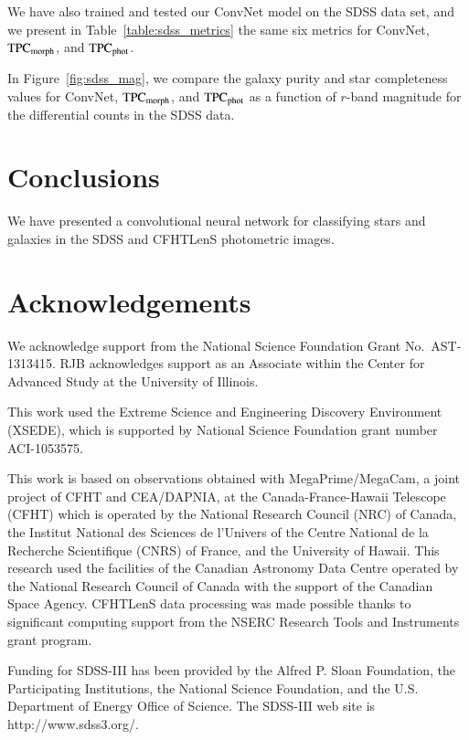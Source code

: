 \documentclass[fleqn,usenatbib]{mnras}
\begin{document}
We have also trained and tested our ConvNet model on the SDSS data set, and
we present in Table~\ref{table:sdss_metrics} the same six metrics for ConvNet,
${\mathrm{TPC}}_{{\mathrm{morph}}}$, and ${\mathrm{TPC}}_{{\mathrm{phot}}}$.

In Figure~\ref{fig:sdss_mag}, we compare the galaxy purity
and star completeness values for ConvNet, ${\mathrm{TPC}}_{{\mathrm{morph}}}$, and
${\mathrm{TPC}}_{{\mathrm{phot}}}$ as a
function of $r$-band magnitude for the differential counts in the SDSS data.



\section{Conclusions}
  \label{sec:conclusions}

We have presented a convolutional neural network for classifying stars and
galaxies in the SDSS and CFHTLenS photometric images.



\section*{Acknowledgements}

We acknowledge support from the 
National Science Foundation Grant No.\ AST-1313415.
RJB acknowledges support as an Associate
within the Center for Advanced Study at the University of Illinois.


This work used the Extreme Science and Engineering Discovery Environment
(XSEDE), which is supported by National Science Foundation grant number
ACI-1053575.

This work is based on observations obtained with MegaPrime/MegaCam, a
joint project of CFHT and CEA/DAPNIA, at the Canada-France-Hawaii
Telescope (CFHT) which is operated by the National Research Council
(NRC) of Canada, the Institut National des Sciences de l'Univers of
the Centre National de la Recherche Scientifique (CNRS) of France, and
the University of Hawaii. This research used the facilities of the
Canadian Astronomy Data Centre operated by the National Research
Council of Canada with the support of the Canadian Space Agency.
CFHTLenS data processing was made possible thanks to significant
computing support from the NSERC Research Tools and Instruments grant
program.

Funding for SDSS-III has been provided by the Alfred P. Sloan Foundation, the
Participating Institutions, the National Science Foundation, and the U.S.
Department of Energy Office of Science. The SDSS-III web site is
http://www.sdss3.org/.
\end{document}

